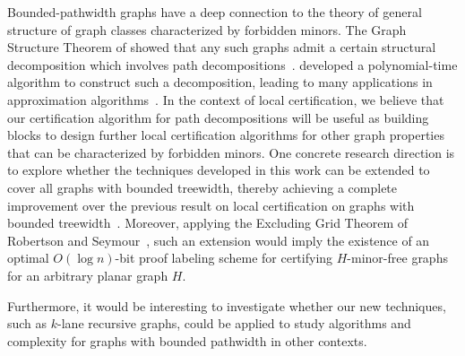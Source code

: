 \documentclass[11pt]{article}
\theoremstyle{definition}
\theoremstyle{remark}
\begin{document}
Bounded-pathwidth graphs have a deep connection to the theory of general structure of graph classes characterized by forbidden minors. The Graph Structure Theorem of \citeauthor{robertson2003graph} showed that any such graphs admit a certain structural decomposition which involves path decompositions~\cite{robertson2003graph}. \citeauthor{1530755} developed a polynomial-time algorithm to construct such a decomposition, leading to many applications in approximation algorithms~\cite{1530755}. In the context of local certification, we believe that our certification algorithm for path decompositions will be useful as building blocks to design further local certification algorithms for other graph properties that can be characterized by forbidden minors. One concrete research direction is to explore whether the techniques developed in this work can be extended to cover all graphs with bounded treewidth, thereby achieving a complete improvement over the previous result on local certification on graphs with bounded treewidth~\cite{fraigniaud2024meta}. Moreover, applying the Excluding Grid Theorem of Robertson and Seymour~\cite{ROBERTSON198692}, such an extension would imply the existence of an optimal $O(\log n)$-bit proof labeling scheme for certifying $H$-minor-free graphs for an arbitrary planar graph $H$.

Furthermore, it would be interesting to investigate whether our new techniques, such as $k$-lane recursive graphs, could be applied to study algorithms and complexity for graphs with bounded pathwidth in other contexts.



\printbibliography
\end{document}
